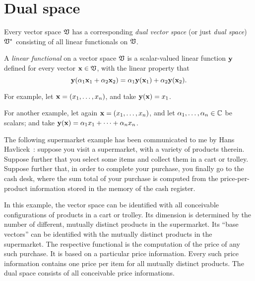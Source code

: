 




\section{Dual space}
\label{2011-m-dvs}

Every vector space ${\frak V}$
has a corresponding {\em dual vector space}
(or just {\em dual space})   ${\frak V}^\ast$
consisting of all linear functionals on ${\frak V}$.

A {\em linear functional}
on a vector space ${\frak V}$ is a scalar-valued linear function ${\bf y}$
defined for every vector   ${\bf x} \in {\frak V}$, with the linear property that
\begin{equation}
{\bf y} (\alpha_1 {\bf x}_1 +\alpha_2 {\bf x}_2)
=
\alpha_1 {\bf y} ({\bf x}_1) +\alpha_2 {\bf y} ({\bf x}_2) .
\end{equation}

{\color{blue}
\bexample
For example,
let ${\bf x} = (x_1,\ldots , x_n)$, and
take
${\bf y} ({\bf x}) =x_1$.

For another example,
let again ${\bf x} = (x_1,\ldots , x_n)$, and
let $\alpha_1,\ldots , \alpha_n \in {\Bbb C}$ be scalars; and
take
${\bf y} ({\bf x}) =\alpha_1 x_1 + \cdots +\alpha_n x_n$.

The following supermarket example has been
communicated to me by Hans Havlicek~\cite{havlicek-priv3}:
suppose you visit a supermarket, with a variety of products therein.
Suppose further that you select some items and collect them in a cart or trolley.
Suppose further that, in order to complete your purchase, you finally go to the cash desk,
where the sum total of your purchase is computed from the price-per-product information stored
in the memory of the cash register.

In this example, the vector space can be identified with all conceivable configurations of products in a cart or trolley.
Its dimension is determined by the number of different, mutually distinct products in the supermarket.
Its ``base vectors'' can be identified with the mutually distinct products in the supermarket.
The respective functional is the computation of the price of any such purchase.
It is based on a particular price information.
Every such price information contains one price per item for all mutually distinct products.
The dual space consists of all conceivable price informations.
\eexample
}


